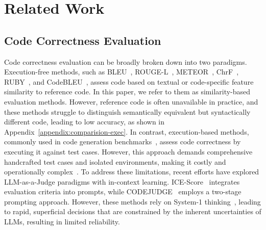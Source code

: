 \section{Related Work}
\subsection{Code Correctness Evaluation} 
Code correctness evaluation can be broadly broken down into two paradigms.
Execution-free methods, such as BLEU~\cite{papineni2002bleu}, ROUGE-L~\cite{lin2004rouge}, METEOR~\cite{denkowski2014meteor}, ChrF~\cite{popovic2015chrf}, RUBY~\cite{tran2019does}, and CodeBLEU~\cite{ren2020codebleu}, assess code based on textual or code-specific feature similarity to reference code.
In this paper, we refer to them as similarity-based evaluation methods. 
However, reference code is often unavailable in practice, and these methods struggle to distinguish semantically equivalent but syntactically different code, leading to low accuracy, as shown in Appendix~\ref{appendix:comparision-exec}.
In contrast, execution-based methods, commonly used in code generation benchmarks~\cite{zheng2023codegeex, zhuo2024bigcodebench}, assess code correctness by executing it against test cases. 
However, this approach demands comprehensive handcrafted test cases and isolated environments, making it costly and operationally complex~\cite{zhang2022codet}.
To address these limitations, recent efforts have explored LLM-as-a-Judge paradigms with in-context learning. ICE-Score~\cite{zhuo2023ice} integrates evaluation criteria into prompts, while CODEJUDGE~\cite{tong2024codejudge} employs a two-stage prompting approach. However, these methods rely on System-1 thinking~\cite{kahneman2011thinking}, leading to rapid, superficial decisions that are constrained by the inherent uncertainties of LLMs, resulting in limited reliability.

